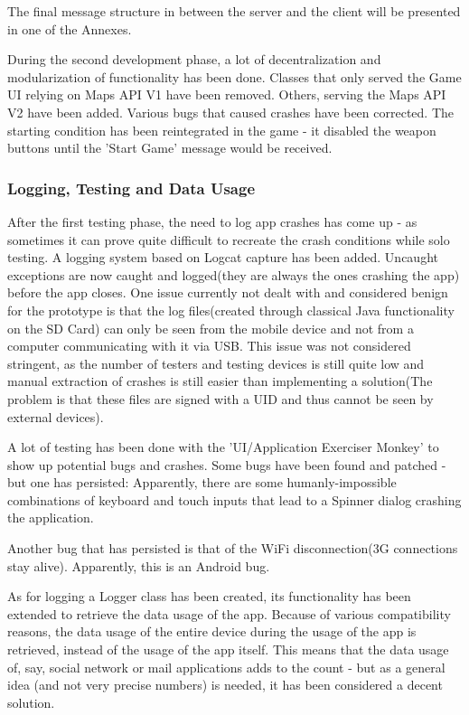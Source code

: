 The final message structure in between the server and the client will be
presented in one of the Annexes.\newline

During the second development phase, a lot of decentralization and
modularization of functionality has been done. Classes that only served the
Game UI relying on Maps API V1 have been removed. Others, serving the Maps API
V2 have been added. Various bugs that caused crashes have been corrected. The
starting condition has been reintegrated in the game - it disabled the weapon
buttons until the 'Start Game' message would be received.\newline

\subsubsection{Logging, Testing and Data Usage}
After the first testing phase, the need to log app crashes has come up - as
sometimes it can prove quite difficult to recreate the crash conditions while
solo testing. A logging system based on Logcat capture has been added. Uncaught
exceptions are now caught and logged(they are always the ones crashing the app)
before the app closes. One issue currently not dealt with and considered
benign for the prototype is that the log files(created through classical Java
functionality on the SD Card) can only be seen from the mobile device and not
from a computer communicating with it via USB. This issue was not considered
stringent, as the number of testers and testing devices is still quite low and
manual extraction of crashes is still easier than implementing a solution(The
problem is that these files are signed with a UID and thus cannot be seen by
external devices).\newline

A lot of testing has been done with the 'UI/Application Exerciser Monkey' to
show up potential bugs and crashes. Some bugs have been found and patched - but
one has persisted: Apparently, there are some humanly-impossible combinations of
keyboard and touch inputs that lead to a Spinner dialog crashing the
application. \newline

Another bug that has persisted is that of the WiFi disconnection(3G connections
stay alive). Apparently, this is an Android bug.\newline

As for logging a Logger class has been created, its functionality has been
extended to retrieve the data usage of the app. Because of various compatibility
reasons, the data usage of the entire device during the usage of the app is
retrieved, instead of the usage of the app itself. This means that the data
usage of, say, social network or mail applications adds to the count - but as a
general idea (and not very precise numbers) is needed, it has been considered a
decent solution.

